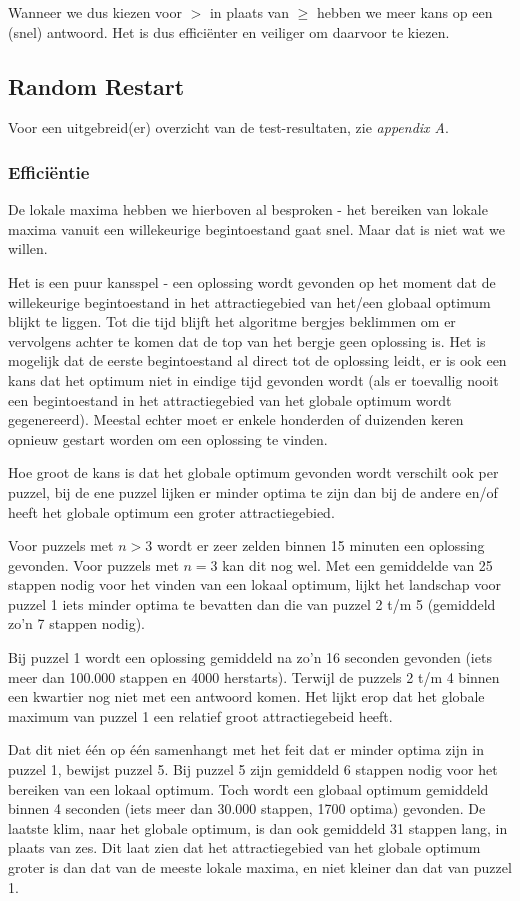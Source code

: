 \documentclass[]{report}
\begin{document}
Wanneer we dus kiezen voor $>$ in plaats van $\geq$ hebben we meer kans op een (snel) antwoord. Het is dus effici\"{e}nter en veiliger om daarvoor te kiezen.

\subsection{Random Restart}
Voor een uitgebreid(er) overzicht van de test-resultaten, zie \textit{appendix A}.
\subsubsection{Effici\"{e}ntie}
De lokale maxima hebben we hierboven al besproken - het bereiken van lokale maxima vanuit een willekeurige begintoestand gaat snel. Maar dat is niet wat we willen.

Het is een puur kansspel - een oplossing wordt gevonden op het moment dat de willekeurige begintoestand in het attractiegebied van het/een globaal optimum blijkt te liggen. Tot die tijd blijft het algoritme bergjes beklimmen om er vervolgens achter te komen dat de top van het bergje geen oplossing is. Het is mogelijk dat de eerste begintoestand al direct tot de oplossing leidt, er is ook een kans dat het optimum niet in eindige tijd gevonden wordt (als er toevallig nooit een begintoestand in het attractiegebied van het globale optimum wordt gegenereerd). Meestal echter moet er enkele honderden of duizenden keren opnieuw gestart worden om een oplossing te vinden.

Hoe groot de kans is dat het globale optimum gevonden wordt verschilt ook per puzzel, bij de ene puzzel lijken er minder optima te zijn dan bij de andere en/of heeft het globale optimum een groter attractiegebied.

Voor puzzels met $n > 3$ wordt er zeer zelden binnen 15 minuten een oplossing gevonden. Voor puzzels met $n=3$ kan dit nog wel. Met een gemiddelde van 25 stappen nodig voor het vinden van een lokaal optimum, lijkt het landschap voor puzzel 1 iets minder optima te bevatten dan die van puzzel 2 t/m 5 (gemiddeld zo'n 7 stappen nodig).

Bij puzzel 1 wordt een oplossing gemiddeld na zo'n 16 seconden gevonden (iets meer dan 100.000 stappen en 4000 herstarts). Terwijl de puzzels 2 t/m 4 binnen een kwartier nog niet met een antwoord komen. Het lijkt erop dat het globale maximum van puzzel 1 een relatief groot attractiegebeid heeft.

Dat dit niet \'{e}\'{e}n op \'{e}\'{e}n samenhangt met het feit dat er minder optima zijn in puzzel 1, bewijst puzzel 5. Bij puzzel 5 zijn gemiddeld 6 stappen nodig voor het bereiken van een lokaal optimum. Toch wordt een globaal optimum gemiddeld binnen 4 seconden (iets meer dan 30.000 stappen, 1700 optima) gevonden. De laatste klim, naar het globale optimum, is dan ook gemiddeld 31 stappen lang, in plaats van zes. Dit laat zien dat het attractiegebied van het globale optimum groter is dan dat van de meeste lokale maxima, en niet kleiner dan dat van puzzel 1.
\end{document}
